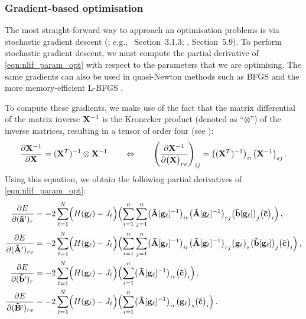 \subsubsection{Gradient-based optimisation}
The most straight-forward way to approach an optimisation problems is via stochastic gradient descent (\SGD; e.g., \cite{bishop2006pattern}~Section~3.1.3; \cite{goodfellow2016deep}, Section~5.9).
To perform stochastic gradient descent, we must compute the partial derivative of \cref{eqn:nlif_param_opt} with respect to the parameters that we are optimising.
The same gradients can also be used in quasi-Newton methods such as BFGS \citep[Chapter~2]{nocedal2006numerical} and the more memory-efficient L-BFGS \citep[Section~9.1]{nocedal2006numerical}.

To compute these gradients, we make use of the fact that the matrix differential of the matrix inverse $\mathbf{X}^{-1}$ is the Kronecker product (denoted as \enquote{$\otimes$}) of the inverse matrices, resulting in a tensor of order four (see \cite[Section~10.6, eq.~1, p.~198]{lutkepohl1997handbook}):
\begin{align}
	\frac{\partial \mathbf{X}^{-1}}{\partial \mathbf{X}}
		= (\mathbf{X}^T)^{-1} \otimes \mathbf{X}^{-1}
	\quad \quad \Leftrightarrow \quad \quad
	\left( \frac{\partial \mathbf{X}^{-1}}{\partial \bigl(\mathbf{X}\bigr)_{rs}} \right)_{ij} =
		\bigl((\mathbf{X}^T)^{-1}\bigr)_{ir} \bigl(\mathbf{X}^{-1}\bigr)_{sj} \,.
	\label{eqn:inverse_differential_tensor}
\end{align}
Using this equation, we obtain the following partial derivatives of \cref{eqn:nlif_param_opt}:%
\begin{align}
	\frac{\partial E}{\partial (\vrap)_{r}} &=
	-2 \sum_{\ell = 1}^N
	\Bigl(H(\vec g_\ell) - J_\ell \Bigr)
   	\Bigl(
   	\sum_{i = 1}^n \sum_{j = 1}^n \bigl( \mrA[\vec g_\ell]^{-1} \bigr)_{ir} \bigl( \mrA[\vec g_\ell]^{-1} \bigr)_{r j} \bigl( \vrb[\vec g_\ell] \bigr)_j \bigl(\vrc\bigr)_i
   	\Bigr) \label{eqn:nlif_parm_grad_a} \,,\\%
%
	\frac{\partial E}{\partial (\mrAp)_{rs}} &=
	-2 \sum_{\ell = 1}^N
	\Bigl(H(\vec g_\ell) - J_\ell \Bigr)
   	\Bigl(
   	\sum_{i = 1}^n \sum_{j = 1}^n \bigl( \mrA[\vec g_\ell]^{-1} \bigr)_{i r} \bigl( \mrA[\vec g_\ell]^{-1} \bigr)_{r j}  \bigl(\vec g_\ell\bigr)_s \bigl( \vrb[\vec g_\ell] \bigr)_j \bigl(\vrc\bigr)_i
   	\Bigr) \label{eqn:nlif_parm_grad_A} \,, \\%
%
	\frac{\partial E}{\partial (\vrbp)_{r}} &=
	-2 \sum_{\ell = 1}^N
	\Bigl(H(\vec g_\ell) - J_\ell \Bigr)
   	\Bigl(
   	\sum_{i=1}^n 
   	 \bigl( \mrA[\vec g_\ell]^{-1} \bigr)_{ir} \bigl(\vrc\bigr)_i
   	\Bigr) \label{eqn:nlif_parm_grad_b} \,, \\%
%
	\frac{\partial E}{\partial (\mrBp)_{rs}} &=
	-2 \sum_{\ell = 1}^N
	\Bigl(H(\vec g_\ell) - J_\ell \Bigr)
   	\Bigl(
   	\sum_{i=1}^n 
   	 \bigl( \mrA[\vec g_\ell]^{-1} \bigr)_{ir} \bigl( \vec g_\ell \bigr)_s \bigl(\vrc\bigr)_i
   	\Bigr) \label{eqn:nlif_parm_grad_B}\,.
\end{align}
